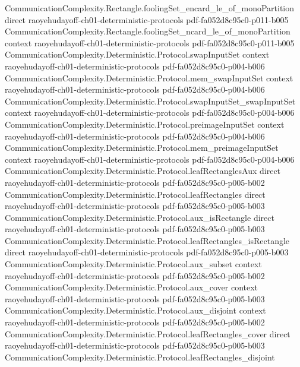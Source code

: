 \begin{theorem}
\proofstep
  {CommunicationComplexity.Rectangle.foolingSet_encard_le_of_monoPartition}
  {direct}
  {raoyehudayoff-ch01-deterministic-protocols}
  {pdf-fa052d8c95c0-p011-b005}
\proofstep
  {CommunicationComplexity.Rectangle.foolingSet_ncard_le_of_monoPartition}
  {context}
  {raoyehudayoff-ch01-deterministic-protocols}
  {pdf-fa052d8c95c0-p011-b005}
\proofstep
  {CommunicationComplexity.Deterministic.Protocol.swapInputSet}
  {context}
  {raoyehudayoff-ch01-deterministic-protocols}
  {pdf-fa052d8c95c0-p004-b006}
\proofstep
  {CommunicationComplexity.Deterministic.Protocol.mem_swapInputSet}
  {context}
  {raoyehudayoff-ch01-deterministic-protocols}
  {pdf-fa052d8c95c0-p004-b006}
\proofstep
  {CommunicationComplexity.Deterministic.Protocol.swapInputSet_swapInputSet}
  {context}
  {raoyehudayoff-ch01-deterministic-protocols}
  {pdf-fa052d8c95c0-p004-b006}
\proofstep
  {CommunicationComplexity.Deterministic.Protocol.preimageInputSet}
  {context}
  {raoyehudayoff-ch01-deterministic-protocols}
  {pdf-fa052d8c95c0-p004-b006}
\proofstep
  {CommunicationComplexity.Deterministic.Protocol.mem_preimageInputSet}
  {context}
  {raoyehudayoff-ch01-deterministic-protocols}
  {pdf-fa052d8c95c0-p004-b006}
\proofstep
  {CommunicationComplexity.Deterministic.Protocol.leafRectanglesAux}
  {direct}
  {raoyehudayoff-ch01-deterministic-protocols}
  {pdf-fa052d8c95c0-p005-b002}
\proofstep
  {CommunicationComplexity.Deterministic.Protocol.leafRectangles}
  {direct}
  {raoyehudayoff-ch01-deterministic-protocols}
  {pdf-fa052d8c95c0-p005-b003}
\proofstep
  {CommunicationComplexity.Deterministic.Protocol.aux_isRectangle}
  {direct}
  {raoyehudayoff-ch01-deterministic-protocols}
  {pdf-fa052d8c95c0-p005-b003}
\proofstep
  {CommunicationComplexity.Deterministic.Protocol.leafRectangles_isRectangle}
  {direct}
  {raoyehudayoff-ch01-deterministic-protocols}
  {pdf-fa052d8c95c0-p005-b003}
\proofstep
  {CommunicationComplexity.Deterministic.Protocol.aux_subset}
  {context}
  {raoyehudayoff-ch01-deterministic-protocols}
  {pdf-fa052d8c95c0-p005-b002}
\proofstep
  {CommunicationComplexity.Deterministic.Protocol.aux_cover}
  {context}
  {raoyehudayoff-ch01-deterministic-protocols}
  {pdf-fa052d8c95c0-p005-b003}
\proofstep
  {CommunicationComplexity.Deterministic.Protocol.aux_disjoint}
  {context}
  {raoyehudayoff-ch01-deterministic-protocols}
  {pdf-fa052d8c95c0-p005-b002}
\proofstep
  {CommunicationComplexity.Deterministic.Protocol.leafRectangles_cover}
  {direct}
  {raoyehudayoff-ch01-deterministic-protocols}
  {pdf-fa052d8c95c0-p005-b003}
\proofstep
  {CommunicationComplexity.Deterministic.Protocol.leafRectangles_disjoint}

\end{theorem}
